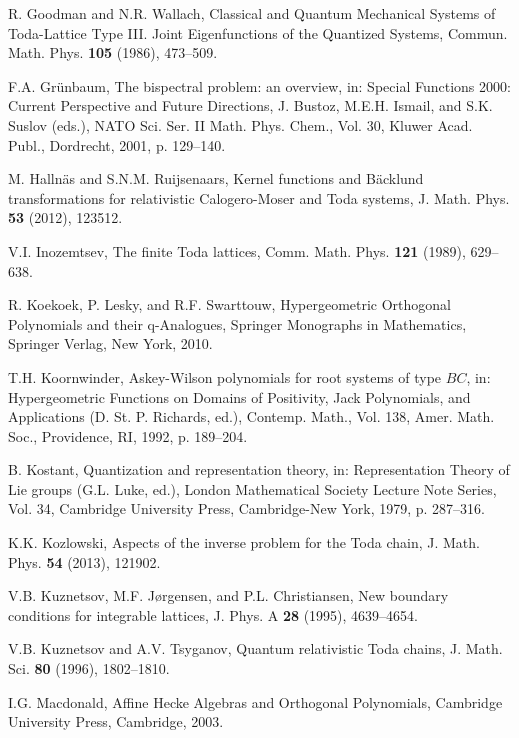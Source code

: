 \documentclass[reqno]{amsart}
\theoremstyle{remark}
\numberwithin{equation}{section}
\begin{document}
\begin{thebibliography}{000000}
 R. Goodman and N.R. Wallach, Classical and Quantum Mechanical Systems 
of Toda-Lattice Type III. Joint Eigenfunctions of the Quantized Systems, Commun. Math. Phys. {\bf 105} (1986), 473--509.

 F.A. Gr\"unbaum,
The bispectral problem: an overview, in: Special Functions 2000: Current Perspective and Future Directions,
J. Bustoz, M.E.H. Ismail, and S.K. Suslov (eds.),
NATO Sci. Ser. II Math. Phys. Chem., Vol.  {30}, Kluwer Acad. Publ., Dordrecht, 2001, p. 129--140.

 M. Halln\"as and S.N.M. Ruijsenaars, Kernel functions and B\"acklund transformations for relativistic Calogero-Moser and Toda systems, J. Math. Phys. {\bf 53} (2012), 123512.

 V.I. Inozemtsev, The finite Toda lattices, Comm. Math. Phys. {\bf 121} (1989), 629--638.

 R. Koekoek, P. Lesky, and R.F. Swarttouw, Hypergeometric Orthogonal Polynomials and their q-Analogues, Springer Monographs in Mathematics, Springer Verlag, New York, 2010.

 T.H. Koornwinder, Askey-Wilson polynomials for
root systems of type $BC$, in: {Hypergeometric Functions on
Domains of Positivity, Jack Polynomials, and Applications} (D. St.
P. Richards, ed.), Contemp. Math., Vol. 138, Amer. Math. Soc.,
Providence, RI, 1992, p. 189--204.

 B. Kostant, Quantization and representation theory, in:
Representation Theory of Lie groups (G.L. Luke, ed.), London Mathematical Society Lecture Note Series, Vol. 34, Cambridge University Press, Cambridge-New York, 1979, p. 287--316.

  K.K. Kozlowski, Aspects of the inverse problem for the Toda chain, J. Math. Phys. {\bf 54} (2013), 121902.

 V.B. Kuznetsov, M.F. J\o{}rgensen, and P.L. Christiansen,
New boundary conditions for integrable lattices,
J. Phys. A {\bf 28} (1995), 4639--4654. 

 V.B. Kuznetsov and A.V. Tsyganov, Quantum relativistic Toda chains,
J. Math. Sci. {\bf 80} (1996), 1802--1810.

 I.G. Macdonald,
{Affine Hecke Algebras and Orthogonal Polynomials},
Cambridge University Press, Cambridge, 2003.


\end{thebibliography}
\end{document}
